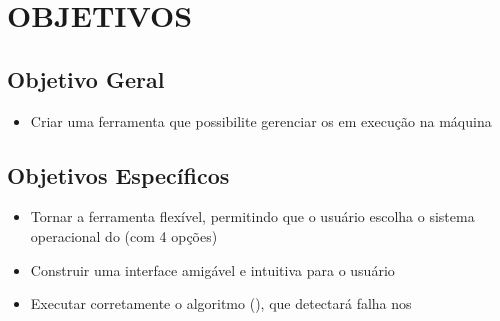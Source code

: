 
\chapter{OBJETIVOS}
\label{chap:objetivos}




\section{Objetivo Geral}
\label{sec:objetivo_geral}

\begin{itemize}
    \item Criar uma ferramenta que possibilite gerenciar os \containers{} em execução na máquina
\end{itemize}




\section{Objetivos Específicos}
\label{sec:objetivos_especificos}

\begin{itemize}
    \item Tornar a ferramenta flexível, permitindo que o usuário escolha o sistema operacional do \conteiner{} (com 4 opções)
    \item Construir uma interface amigável e intuitiva para o usuário
    \item Executar corretamente o algoritmo (\adaptive{}), que detectará falha nos \containers{}
\end{itemize}